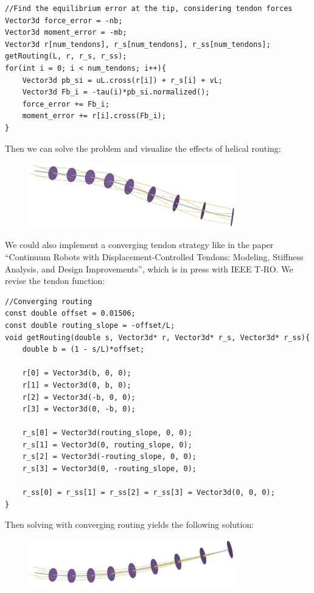 \documentclass[12pt]{article}
\begin{document}
\begin{lstlisting}
//Find the equilibrium error at the tip, considering tendon forces
Vector3d force_error = -nb;
Vector3d moment_error = -mb;
Vector3d r[num_tendons], r_s[num_tendons], r_ss[num_tendons];
getRouting(L, r, r_s, r_ss);
for(int i = 0; i < num_tendons; i++){
    Vector3d pb_si = uL.cross(r[i]) + r_s[i] + vL;
    Vector3d Fb_i = -tau(i)*pb_si.normalized();
    force_error += Fb_i;
    moment_error += r[i].cross(Fb_i);
}
\end{lstlisting}
Then we can solve the problem and visualize the effects of helical routing:
\begin{figure}[h]
	\centering
		\includegraphics[width=0.8\textwidth]{fig/Helical.jpg}
\end{figure}

We could also implement a converging tendon strategy like in the paper ``Continuum Robots with Displacement-Controlled Tendons: Modeling, Stiffness Analysis, and Design Improvements'', which is in press with IEEE T-RO. We revise the tendon function:
\begin{lstlisting}
//Converging routing
const double offset = 0.01506;
const double routing_slope = -offset/L;
void getRouting(double s, Vector3d* r, Vector3d* r_s, Vector3d* r_ss){
    double b = (1 - s/L)*offset;

    r[0] = Vector3d(b, 0, 0);
    r[1] = Vector3d(0, b, 0);
    r[2] = Vector3d(-b, 0, 0);
    r[3] = Vector3d(0, -b, 0);

    r_s[0] = Vector3d(routing_slope, 0, 0);
    r_s[1] = Vector3d(0, routing_slope, 0);
    r_s[2] = Vector3d(-routing_slope, 0, 0);
    r_s[3] = Vector3d(0, -routing_slope, 0);

    r_ss[0] = r_ss[1] = r_ss[2] = r_ss[3] = Vector3d(0, 0, 0);
}
\end{lstlisting}
Then solving with converging routing yields the following solution:
\begin{figure}[h]
	\centering
		\includegraphics[width=0.8\textwidth]{fig/Converging.jpg}
\end{figure}
\end{document}
